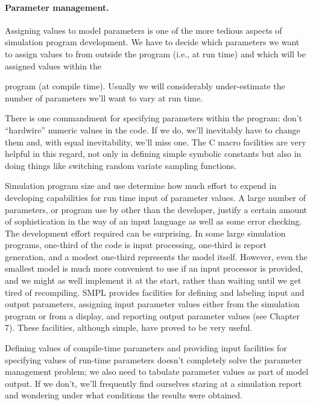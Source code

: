 \paragraph{Parameter management.}
Assigning values to model parameters is one of the more tedious aspects of
simulation program development. We have to decide which parameters we want to
assign values to from outside the program (i.e., at run time) and which will be assigned values within the

\noindent program (at compile time). Usually we will
considerably under-estimate the number of parameters we'll want to vary at run
 time.

There is one commandment for specifying parameters within the program: don't
``hardwire'' numeric values in the code. If we do, we'll inevitably have to
change them and, with equal inevitability, we'll miss one. The C macro
facilities are very helpful in this regard, not only in defining simple
symbolic constants but also in doing things like switching random variate
sampling functions.

Simulation program size and use determine how much effort to expend in
developing capabilities for run time input of parameter values. A large number
of parameters, or program use by other than the developer, justify a certain
amount of sophistication in the way of an input language as well as some error
checking. The development effort required can be surprising. In some large
simulation programs, one-third of the code is input processing, one-third is
report generation, and a modest one-third represents the model itself.
However, even the smallest model is much more convenient to use if an input
processor is provided, and we might as well implement it at the start, rather
than waiting until we get tired of recompiling. SMPL provides facilities for
defining and labeling input and output parameters, assigning input parameter
values either from the simulation program or from a display, and reporting
output parameter values (see Chapter 7). These facilities, although simple,
have proved to be very useful.

Defining values of compile-time parameters and providing input facilities for
specifying values of run-time parameters doesn't completely solve the
parameter management problem; we also need to tabulate parameter values as
part of model output. If we don't, we'll frequently find ourselves staring at a
simulation report and wondering under what conditions the results were
obtained.

